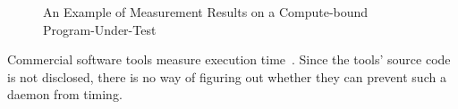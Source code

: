 \documentclass[letter]{ieice}
\begin{document}
\begin{figure}[t]
	\centering
	\caption{An Example of Measurement Results on a \linebreak \hbox{Compute-bound} 
	Program-Under-Test~\label{fig:meas_comp}}
	\vspace{-.18in}
\end{figure} 

Commercial software tools measure execution time~\cite{VTune,TimeSys,WindView}. 
Since the tools' source code is not disclosed, there is no way of figuring out 
whether they can prevent such a daemon from timing. 
\end{document}

